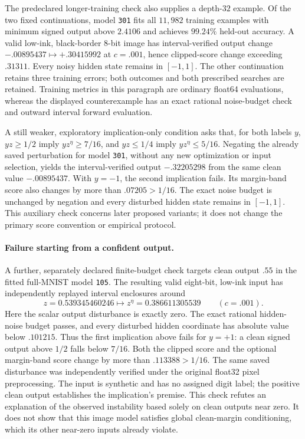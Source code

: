 The predeclared longer-training check also supplies a depth-$32$ example.  Of the two fixed continuations, model \texttt{301} fits all $11{,}982$ training examples with minimum signed output above $2.4106$ and achieves $99.24\%$ held-out accuracy.  A valid low-ink, black-border 8-bit image has interval-verified output change $-.00895437\mapsto+.30415992$ at $c=.001$, hence clipped-score change exceeding $.31311$.  Every noisy hidden state remains in $[-1,1]$.  The other continuation retains three training errors; both outcomes and both prescribed searches are retained.  Training metrics in this paragraph are ordinary float64 evaluations, whereas the displayed counterexample has an exact rational noise-budget check and outward interval forward evaluation.

A still weaker, exploratory implication-only condition asks that, for both labels $y$, $yz\ge1/2$ imply $yz^\eta\ge7/16$, and $yz\le1/4$ imply $yz^\eta\le5/16$.  Negating the already saved perturbation for model \texttt{301}, without any new optimization or input selection, yields the interval-verified output $-.32205298$ from the same clean value $-.00895437$.  With $y=-1$, the second implication fails.  Its margin-band score also changes by more than $.07205>1/16$.  The exact noise budget is unchanged by negation and every disturbed hidden state remains in $[-1,1]$.  This auxiliary check concerns later proposed variants; it does not change the primary score convention or empirical protocol.

\paragraph{Failure starting from a confident output.}
A further, separately declared finite-budget check targets clean output $.55$ in the fitted full-MNIST model \texttt{105}.  The resulting valid eight-bit, low-ink input has independently replayed interval enclosures around
\[
 z=0.539345460246\longmapsto z^\eta=0.386611305539
 \qquad(c=.001).
\]
Here the scalar output disturbance is exactly zero.  The exact rational hidden-noise budget passes, and every disturbed hidden coordinate has absolute value below $.101215$.  Thus the first implication above fails for $y=+1$: a clean signed output above $1/2$ falls below $7/16$.  Both the clipped score and the optional margin-band score change by more than $.113388>1/16$.  The same saved disturbance was independently verified under the original float32 pixel preprocessing.  The input is synthetic and has no assigned digit label; the positive clean output establishes the implication's premise.  This check refutes an explanation of the observed instability based solely on clean outputs near zero.  It does not show that this image model satisfies global clean-margin conditioning, which its other near-zero inputs already violate.
